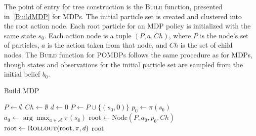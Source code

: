 \documentclass[letterpaper]{article} %
\begin{document}
The point of entry for tree construction is the \textsc{Build} function, presented in~\cref{BuildMDP} for MDPs.
The initial particle set is created and clustered into the root action node.
Each root particle for an MDP policy is initialized with the same state $s_0$.
Each action node is a tuple $(P, a, Ch)$, where $P$ is the node's set of particles, $a$ is the action taken from that node, and $Ch$ is the set of child nodes.
The \textsc{Build} function for POMDPs follows the same procedure as for MDPs, though states and observations for the initial particle set are sampled from the initial belief $b_0$.
\begin{algorithm}[htb]
\caption{Build MDP}\label{BuildMDP}
\begin{algorithmic}[1]
        \State $P \gets \emptyset$
        \State $Ch \gets \emptyset$
        \State $d \gets 0$
            \State $P \gets P \cup \{ (s_0, 0) \}$
        \EndFor
        \State $p_0 \gets \pi(s_0)$
        \State $a_0 \gets \arg\max_{a \in \mathcal{A}} \pi(s_0)$
        \State $\text{root} \gets \text{Node}(P, a_0, p_0, Ch)$
        \State $\text{root} \gets \textsc{Rollout}(\text{root}, \pi, d)$
        \State \Return $\text{root}$
    \EndProcedure
\end{algorithmic}
\end{algorithm}

\end{document}
